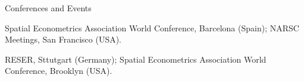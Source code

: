 \documentclass[12pt,2up]{article}
\begin{document}
\begin{cv}{}
\begin{cvlist}{Conferences and Events}
\item[2009] Spatial Econometrics Association World Conference, Barcelona (Spain);
    NARSC Meetings, San Francisco (USA).

\item[2008] RESER, Sttutgart (Germany);
    Spatial Econometrics Association World Conference, Brooklyn (USA).










\end{cvlist}
\end{cv}
\end{document}
